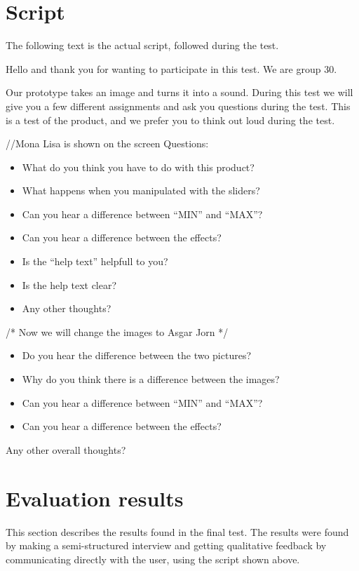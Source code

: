 \section{Script}
The following text is the actual script, followed during the test.

Hello and thank you for wanting to participate in this test. We are group 30.

Our prototype takes an image and turns it into a sound. During this test we will give you a few different assignments and ask you questions during the test. This is a test of the product, and we prefer you to think out loud during the test.

//Mona Lisa is shown on the screen 
Questions: 


\begin{itemize}
\item What do you think you have to do with this product?
\item What happens when you manipulated with the sliders?
\item Can you hear a difference between “MIN” and “MAX”?
\item Can you hear a difference between the effects?
\item Is the “help text” helpfull to you?
\item Is the help text clear?
\item Any other thoughts?
\end{itemize}



/* Now we will change the images to Asgar Jorn */
\begin{itemize}
\item Do you hear the difference between the two pictures?
\item Why do you think there is a difference between the images?
\item Can you hear a difference between “MIN” and “MAX”?
\item Can you hear a difference between the effects?
\end{itemize}


Any other overall thoughts?


\section{Evaluation results}
This section describes the results found in the final test. The results were found by making a semi-structured interview and getting qualitative feedback by communicating directly with the user, using the script shown above. 

